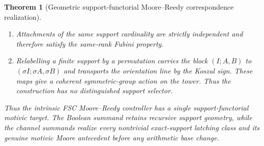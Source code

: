 \documentclass[11pt]{article}
\newtheorem{theorem}{Theorem}[section]
\theoremstyle{remark}
\newcommand{\Mot}{\mathrm{Mot}}
\begin{document}
\begin{theorem}[Geometric support-functorial Moore--Reedy correspondence realization]
\begin{enumerate}[label=\textup{(\roman*)}]
placements of the original root-stack localization class $c^{\Mot}$; no new
abstract Moore complex is introduced at higher support.
\item Attachments of the same support cardinality are strictly independent and
therefore satisfy the same-rank Fubini property.
\item Relabelling a finite support by a permutation carries the block
$(I;A,B)$ to $(\sigma I;\sigma A,\sigma B)$ and transports the orientation
line by the Koszul sign.  These maps give a coherent symmetric-group action on
the tower.  Thus the construction has no distinguished support selector.
\end{enumerate}
Thus the intrinsic FSC Moore--Reedy controller has a single support-functorial
motivic target.  The Boolean summand retains recursive support geometry, while
the channel summands realize every nontrivial exact-support latching class and
its genuine motivic Moore antecedent before any arithmetic base change.
\end{theorem}
\end{document}

